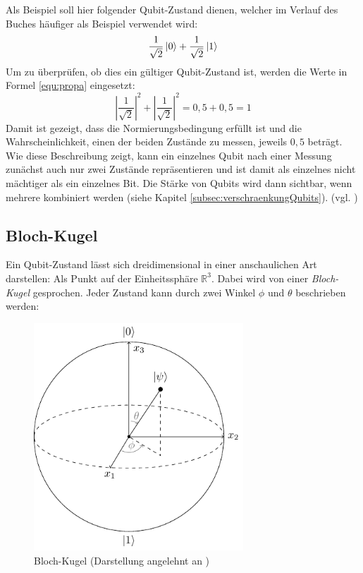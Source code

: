 Als Beispiel soll hier folgender Qubit-Zustand dienen, welcher im Verlauf des Buches häufiger als Beispiel verwendet wird:
\begin{equation}
\label{equ:basicZustand}
    \frac{1}{\sqrt{2}}\ket{0} + \frac{1}{\sqrt{2}}\ket{1}
\end{equation}
Um zu überprüfen, ob dies ein gültiger Qubit-Zustand ist, werden die Werte in Formel \ref{equ:propa} eingesetzt:
\begin{equation}
    \left|\frac{1}{\sqrt{2}}\right|^2 + \left|\frac{1}{\sqrt{2}}\right|^2 = 0{,}5 + 0{,}5 = 1
\end{equation}
Damit ist gezeigt, dass die Normierungsbedingung erfüllt ist und die Wahrscheinlichkeit, einen der beiden Zustände zu messen, jeweils $0{,}5$ beträgt.
Wie diese Beschreibung zeigt, kann ein einzelnes Qubit nach einer Messung zunächst auch nur zwei Zustände repräsentieren und ist damit als einzelnes nicht mächtiger als ein einzelnes Bit. Die Stärke von Qubits wird dann sichtbar, wenn mehrere kombiniert werden (siehe Kapitel \ref{subsec:verschraenkungQubits}). (vgl. \cite[14]{nielsen_quantum_2010})

\subsection{Bloch-Kugel}\label{subsec:blockkugel}
Ein Qubit-Zustand lässt sich dreidimensional in einer anschaulichen Art darstellen: Als Punkt auf der Einheitssphäre $ \mathbb{R}^ 3 $. Dabei wird von einer \emph{Bloch-Kugel} gesprochen. Jeder Zustand
kann durch zwei Winkel $\phi$ und $\theta$ beschrieben werden:

\begin{figure}[H]
  \centering
  \includegraphics[width=0.7\textwidth]{images/quantum-information/bloch.pdf}
  \caption{Bloch-Kugel (Darstellung angelehnt an \cite{riebesell_scientific_2022})}\label{fig:bloch-sphere}
\end{figure}

